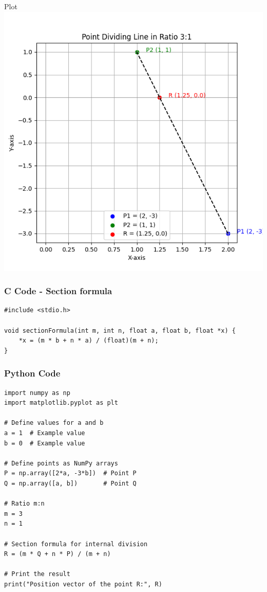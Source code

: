 \documentclass{beamer}
\begin{document}
\begin{frame}{Plot}
\centering
\includegraphics[height=0.7\textheight, keepaspectratio]{figs/q1.png}
\end{frame}

\begin{frame}[fragile]
    \frametitle{C Code - Section formula}

    \begin{lstlisting}
#include <stdio.h>

void sectionFormula(int m, int n, float a, float b, float *x) {
    *x = (m * b + n * a) / (float)(m + n);
}

    \end{lstlisting}
\end{frame}

\begin{frame}[fragile]
    \frametitle{Python Code}

    \begin{lstlisting}
import numpy as np
import matplotlib.pyplot as plt

# Define values for a and b
a = 1  # Example value
b = 0  # Example value

# Define points as NumPy arrays
P = np.array([2*a, -3*b])  # Point P
Q = np.array([a, b])       # Point Q

# Ratio m:n
m = 3
n = 1

# Section formula for internal division
R = (m * Q + n * P) / (m + n)

# Print the result
print("Position vector of the point R:", R)

    \end{lstlisting}
\end{frame}
\end{document}
